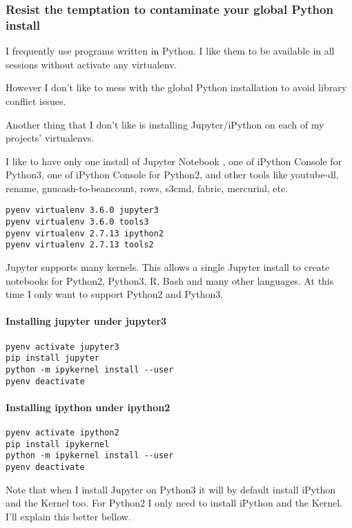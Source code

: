 \documentclass[11pt]{article}
\begin{document}
\subsubsection{Resist the temptation to contaminate your global Python install}
\label{sec:org3fc0cbd}

I frequently use programs written in Python. I like them to be available in all sessions without activate any virtualenv.

However I don't like to mess with the global Python installation to avoid library conflict issues.

Another thing that I don't like is installing Jupyter/iPython on each of my projects' virtualenvs.

I like to have only one install of Jupyter Notebook , one of iPython Console for Python3, one of iPython Console for Python2, and other tools like youtube-dl, rename, gnucash-to-beancount, rows, s3cmd, fabric, mercurial, etc.

\begin{verbatim}
pyenv virtualenv 3.6.0 jupyter3
pyenv virtualenv 3.6.0 tools3
pyenv virtualenv 2.7.13 ipython2
pyenv virtualenv 2.7.13 tools2
\end{verbatim}

Jupyter supports many kernels. This allows a single Jupyter install to create notebooks for Python2, Python3, R, Bash and many other languages. At this time I only want to support Python2 and Python3.

\paragraph{Installing jupyter under jupyter3}
\label{sec:org7ccfeae}

\begin{verbatim}
pyenv activate jupyter3
pip install jupyter
python -m ipykernel install --user
pyenv deactivate
\end{verbatim}

\paragraph{Installing ipython under ipython2}
\label{sec:org8f30cf1}

\begin{verbatim}
pyenv activate ipython2
pip install ipykernel
python -m ipykernel install --user
pyenv deactivate
\end{verbatim}

Note that when I install Jupyter on Python3 it will by default install iPython and the Kernel too. For Python2 I only need to install iPython and the Kernel. I'll explain this better bellow.
\end{document}
